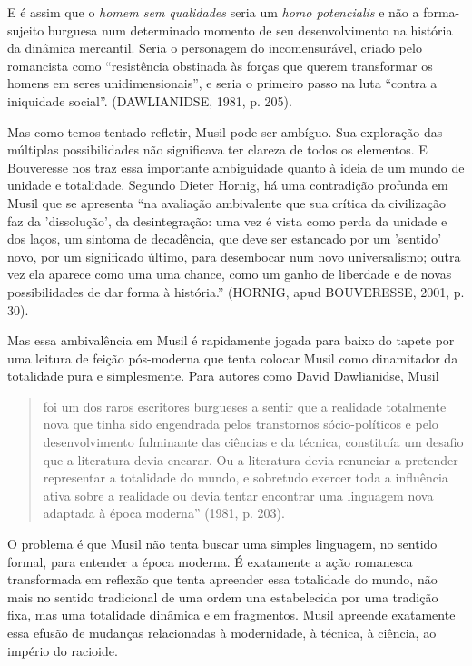 E é assim que o \emph{homem sem qualidades} seria um \emph{homo
potencialis} e não a forma-sujeito burguesa num determinado momento de
seu desenvolvimento na história da dinâmica mercantil. Seria o
personagem do incomensurável, criado pelo romancista como ``resistência
obstinada às forças que querem transformar os homens em seres
unidimensionais'', e seria o primeiro passo na luta ``contra a
iniquidade social''. (DAWLIANIDSE, 1981, p. 205).

Mas como temos tentado refletir, Musil pode ser ambíguo. Sua exploração
das múltiplas possibilidades não significava ter clareza de todos os
elementos. E Bouveresse nos traz essa importante ambiguidade quanto à
ideia de um mundo de unidade e totalidade. Segundo Dieter Hornig, há uma
contradição profunda em Musil que se apresenta ``na avaliação
ambivalente que sua crítica da civilização faz da 'dissolução', da
desintegração: uma vez é vista como perda da unidade e dos laços, um
sintoma de decadência, que deve ser estancado por um 'sentido' novo, por
um significado último, para desembocar num novo universalismo; outra vez
ela aparece como uma uma chance, como um ganho de liberdade e de novas
possibilidades de dar forma à história.'' (HORNIG, apud BOUVERESSE,
2001, p. 30).

Mas essa ambivalência em Musil é rapidamente jogada para baixo do tapete
por uma leitura de feição pós-moderna que tenta colocar Musil como
dinamitador da totalidade pura e simplesmente. Para autores como David
Dawlianidse, Musil

\begin{quote}
foi um dos raros escritores burgueses a sentir que a realidade
totalmente nova que tinha sido engendrada pelos transtornos
sócio-políticos e pelo desenvolvimento fulminante das ciências e da
técnica, constituía um desafio que a literatura devia encarar. Ou a
literatura devia renunciar a pretender representar a totalidade do
mundo, e sobretudo exercer toda a influência ativa sobre a realidade ou
devia tentar encontrar uma linguagem nova adaptada à época moderna''
(1981, p. 203).
\end{quote}

O problema é que Musil não tenta buscar uma simples linguagem, no
sentido formal, para entender a época moderna. É exatamente a ação
romanesca transformada em reflexão que tenta apreender essa totalidade
do mundo, não mais no sentido tradicional de uma ordem una estabelecida
por uma tradição fixa, mas uma totalidade dinâmica e em fragmentos.
Musil apreende exatamente essa efusão de mudanças relacionadas à
modernidade, à técnica, à ciência, ao império do racioide.

